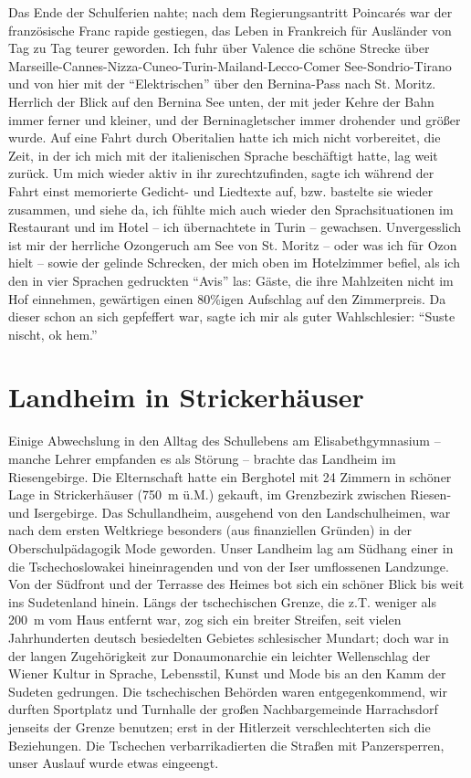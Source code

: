 Das Ende der Schulferien nahte; nach dem Regierungsantritt Poincarés war der französische Franc rapide gestiegen, das Leben in Frankreich für Ausländer von Tag zu Tag teurer geworden. Ich fuhr über Valence die schöne Strecke über Marseille-Cannes-Nizza-Cuneo-Turin-Mailand-Lecco-Comer See-Sondrio-Tirano und von hier mit der \enquote{Elektrischen} über den Bernina-Pass nach St. Moritz. Herrlich der Blick auf den Bernina See unten, der mit jeder Kehre der Bahn immer ferner und kleiner, und der Berninagletscher immer drohender und größer wurde. Auf eine Fahrt durch Oberitalien hatte ich mich nicht vorbereitet, die Zeit, in der ich mich mit der italienischen Sprache beschäftigt hatte, lag weit zurück. Um mich wieder aktiv in ihr zurechtzufinden, sagte ich während der Fahrt einst memorierte Gedicht- und Liedtexte auf, bzw. bastelte sie wieder zusammen, und siehe da, ich fühlte mich auch wieder den Sprachsituationen im Restaurant und im Hotel -- ich übernachtete in Turin -- gewachsen. Unvergesslich ist mir der herrliche Ozongeruch am See von St. Moritz -- oder was ich für Ozon hielt -- sowie der gelinde Schrecken, der mich oben im Hotelzimmer befiel, als ich den in vier Sprachen gedruckten \enquote{Avis} las: Gäste, die ihre Mahlzeiten nicht im Hof einnehmen, gewärtigen einen 80\%igen Aufschlag auf den Zimmerpreis. Da dieser schon an sich gepfeffert war, sagte ich mir als guter Wahlschlesier: \enquote{Suste nischt, ok hem.}


\section{Landheim in Strickerhäuser}
Einige Abwechslung in den Alltag des Schullebens am Elisabethgymnasium -- manche Lehrer empfanden es als Störung -- brachte das Landheim im Riesengebirge. Die Elternschaft hatte ein Berghotel mit 24 Zimmern in schöner Lage in Strickerhäuser (750~m ü.M.) gekauft, im Grenzbezirk zwischen Riesen- und Isergebirge. Das Schullandheim, ausgehend von den Landschulheimen, war nach dem ersten Weltkriege besonders (aus finanziellen Gründen) in der Oberschulpädagogik Mode geworden. Unser Landheim lag am Südhang einer in die Tschechoslowakei hineinragenden und von der Iser umflossenen Landzunge. Von der Südfront und der Terrasse des Heimes bot sich ein schöner Blick bis weit ins Sudetenland hinein. Längs der tschechischen Grenze, die z.T. weniger als 200~m vom Haus entfernt war, zog sich ein breiter Streifen, seit vielen Jahrhunderten deutsch besiedelten Gebietes schlesischer Mundart; doch war in der langen Zugehörigkeit zur Donaumonarchie ein leichter Wellenschlag der Wiener Kultur in Sprache, Lebensstil, Kunst und Mode bis an den Kamm der Sudeten gedrungen. Die tschechischen Behörden waren entgegenkommend, wir durften Sportplatz und Turnhalle der großen Nachbargemeinde Harrachsdorf jenseits der Grenze benutzen; erst in der Hitlerzeit verschlechterten sich die Beziehungen. Die Tschechen verbarrikadierten die Straßen mit Panzersperren, unser Auslauf wurde etwas eingeengt.


